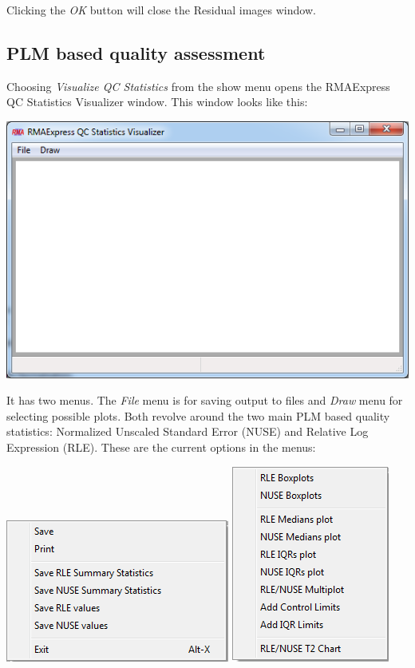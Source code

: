 \documentclass[11pt]{report}
\begin{document}
Clicking the {\it OK} button will close the Residual images window.

\subsection{PLM based quality assessment} \label{sec:PLM QC}

Choosing {\it  Visualize QC Statistics} from the show menu opens the RMAExpress QC Statistics Visualizer window. This window looks like this: 
\begin{center}
\includegraphics[scale=0.5]{QCVisualize1.png}
\end{center}

It has two menus. The {\it File} menu is for saving output to files and {\it Draw} menu for selecting possible plots. Both revolve around the two main PLM based quality statistics: Normalized Unscaled Standard Error (NUSE) and Relative Log Expression (RLE). These are the current options in the menus:
\begin{center}
\includegraphics[scale=0.5]{QCVisualize2.png}\hspace{0.5in}
\includegraphics[scale=0.5]{QCVisualize3.png} \\
\end{center}
\end{document}
